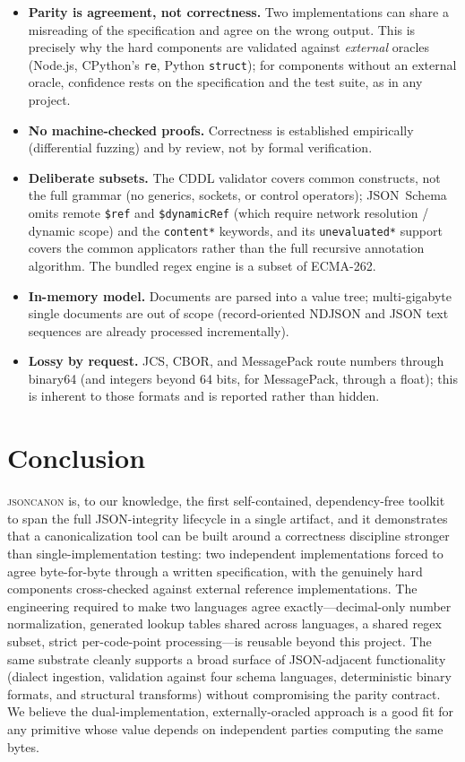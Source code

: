 \documentclass[11pt]{article}
\newcommand{\tool}{\textsc{jsoncanon}}
\newcommand{\code}[1]{\texttt{#1}}
\begin{document}
\begin{itemize}[leftmargin=1.4em,itemsep=2pt]
  \item \textbf{Parity is agreement, not correctness.} Two implementations can
        share a misreading of the specification and agree on the wrong output.
        This is precisely why the hard components are validated against
        \emph{external} oracles (Node.js, CPython's \code{re}, Python
        \code{struct}); for components without an external oracle, confidence
        rests on the specification and the test suite, as in any project.
  \item \textbf{No machine-checked proofs.} Correctness is established
        empirically (differential fuzzing) and by review, not by formal
        verification.
  \item \textbf{Deliberate subsets.} The CDDL validator covers common
        constructs, not the full grammar (no generics, sockets, or control
        operators); JSON~Schema omits remote \code{\$ref} and \code{\$dynamicRef}
        (which require network resolution / dynamic scope) and the
        \code{content*} keywords, and its \code{unevaluated*} support covers the
        common applicators rather than the full recursive annotation algorithm.
        The bundled regex engine is a subset of ECMA-262.
  \item \textbf{In-memory model.} Documents are parsed into a value tree;
        multi-gigabyte single documents are out of scope (record-oriented
        NDJSON and JSON text sequences are already processed incrementally).
  \item \textbf{Lossy by request.} JCS, CBOR, and MessagePack route numbers
        through binary64 (and integers beyond 64 bits, for MessagePack, through
        a float); this is inherent to those formats and is reported rather than
        hidden.
\end{itemize}

\section{Conclusion}\label{sec:conclusion}

\tool{} is, to our knowledge, the first self-contained, dependency-free toolkit
to span the full JSON-integrity lifecycle in a single artifact, and it
demonstrates that a canonicalization tool can be built around a correctness
discipline stronger than single-implementation testing: two
independent implementations forced to agree byte-for-byte through a written
specification, with the genuinely hard components cross-checked against external
reference implementations. The engineering required to make two languages agree
exactly---decimal-only number normalization, generated lookup tables shared
across languages, a shared regex subset, strict per-code-point processing---is
reusable beyond this project. The same substrate cleanly supports a broad
surface of JSON-adjacent functionality (dialect ingestion, validation against
four schema languages, deterministic binary formats, and structural transforms)
without compromising the parity contract. We believe the dual-implementation,
externally-oracled approach is a good fit for any primitive whose value depends
on independent parties computing the same bytes.
\end{document}
